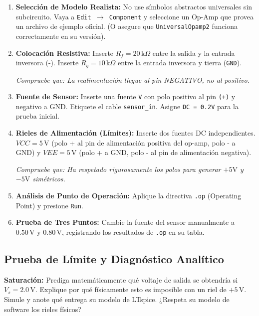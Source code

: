 \documentclass[11pt, a4paper]{article}
\begin{document}
\begin{enumerate}
    \item \textbf{Selección de Modelo Realista:} No use símbolos abstractos universales sin subcircuito. Vaya a \texttt{Edit $\to$ Component} y seleccione un Op-Amp que provea un archivo de ejemplo oficial. (O asegure que \texttt{UniversalOpamp2} funciona correctamente en su versión).
    
    \item \textbf{Colocación Resistiva:} Inserte $R_f=20\,\text{k}\Omega$ entre la salida y la entrada inversora (-). Inserte $R_g=10\,\text{k}\Omega$ entre la entrada inversora y tierra (\texttt{GND}). \par
    \textit{Compruebe que: La realimentación llegue al pin NEGATIVO, no al positivo.}
    
    \item \textbf{Fuente de Sensor:} Inserte una fuente \texttt{V} con polo positivo al pin \texttt{(+)} y negativo a GND. Etiquete el cable \texttt{sensor\_in}. Asigne \texttt{DC = 0.2V} para la prueba inicial.
    
    \item \textbf{Rieles de Alimentación (Límites):} Inserte dos fuentes DC independientes. $VCC=5\,\text{V}$ (polo + al pin de alimentación positiva del op-amp, polo - a GND) y $VEE=5\,\text{V}$ (polo + a GND, polo - al pin de alimentación negativa). \par
    \textit{Compruebe que: Ha respetado rigurosamente los polos para generar $+5\text{V}$ y $-5\text{V}$ simétricos.}
    
    \item \textbf{Análisis de Punto de Operación:} Aplique la directiva \texttt{.op} (Operating Point) y presione \texttt{Run}.
    
    \item \textbf{Prueba de Tres Puntos:} Cambie la fuente del sensor manualmente a $0.50\,\text{V}$ y $0.80\,\text{V}$, registrando los resultados de \texttt{.op} en su tabla.
\end{enumerate}

\subsection{Prueba de Límite y Diagnóstico Analítico}
\textbf{Saturación:} Prediga matemáticamente qué voltaje de salida se obtendría si $V_s = 2.0\,\text{V}$. Explique por qué físicamente esto es imposible con un riel de $+5\,\text{V}$. Simule y anote qué entrega su modelo de LTspice. ¿Respeta su modelo de software los rieles físicos?
\end{document}
